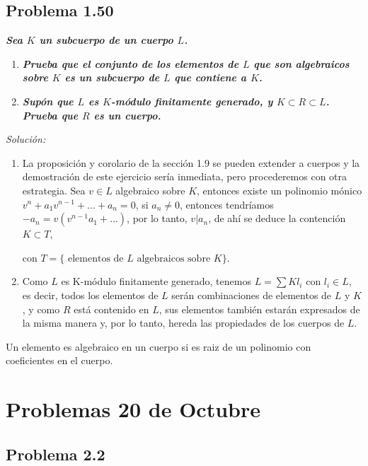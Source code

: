 \subsection{Problema 1.50}

\textit{\textbf{Sea $K$ un subcuerpo de un cuerpo $L$.}}
\begin{enumerate}
\item \textit{\textbf{Prueba que el conjunto de los elementos de $L$ que son algebraicos sobre $K$ es un subcuerpo de $L$ que contiene a $K$.}}
\item \textit{\textbf{Supón que $L$ es $K$-módulo finitamente generado, y $K\subset R\subset L$. Prueba que $R$ es un cuerpo.}}
\end{enumerate}

\textit{Solución: }

\begin{enumerate}
\item   La proposición y corolario de la sección 1.9 se pueden extender a cuerpos y la demostración de este ejercicio sería inmediata, pero procederemos con otra estrategia. Sea $v\in L$ algebraico sobre $K$, entonces existe un polinomio mónico $v^n+a_1v^{n-1}+\dots+a_n=0$, si $a_n\neq 0$, entonces tendríamos $-a_n=v(v^{n-1}a_1+\dots)$, por lo tanto, $v|a_n$, de ahí se deduce la contención $K\subset T$,

  con $T=\{\text{ elementos de } L \text{ algebraicos sobre } K \}$.

\item Como $L$ es K-módulo finitamente generado, tenemos $L=\sum Kl_i$ con $l_i\in L$, es decir, todos los elementos de $L$ serán combinaciones de elementos de $L$ y $K$, y como $R$ está contenido en $L$, sus elementos también estarán expresados de la misma manera y, por lo tanto, hereda las propiedades de los cuerpos de $L$.
\end{enumerate}

\begin{nota}
Un elemento es algebraico en un cuerpo si es raiz de un polinomio con coeficientes en el cuerpo.
\end{nota}

\section{Problemas 20 de Octubre}

\subsection{Problema 2.2}

